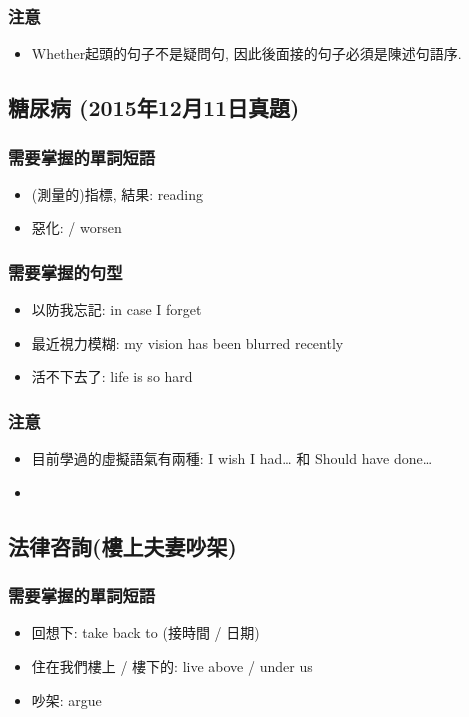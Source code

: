 \subsubsection*{注意}
\begin{itemize}
  \itemsep0em
  \item Whether起頭的句子不是疑問句,  因此後面接的句子必須是陳述句語序.
\end{itemize}

\subsection{糖尿病 (2015年12月11日真題)}
\subsubsection*{需要掌握的單詞短語}
\begin{itemize}
  \itemsep0em
  \item (測量的)指標, 結果: reading
  \item 惡化:  / worsen
\end{itemize}

\subsubsection*{需要掌握的句型}
\begin{itemize}
  \itemsep0em
  \item 以防我忘記: in case I forget
  \item 最近視力模糊: my vision has been blurred recently
  \item 活不下去了: life is so hard
\end{itemize}

\subsubsection*{注意}
\begin{itemize}
  \itemsep0em
  \item 目前學過的虛擬語氣有兩種: I wish I had… 和 Should have done…
  \item {}
\end{itemize}

\subsection{法律咨詢(樓上夫妻吵架)}
\subsubsection*{需要掌握的單詞短語}
\begin{itemize}
  \itemsep0em
  \item 回想下: take back to (接時間 / 日期)
  \item 住在我們樓上 / 樓下的: live above / under us
  \item 吵架: argue
\end{itemize}

